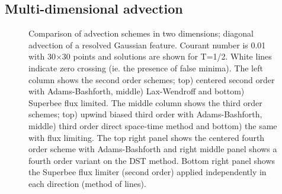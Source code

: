 

\subsection{Multi-dimensional advection}

\begin{figure}
\caption{
Comparison of advection schemes in two dimensions; diagonal advection
of a resolved Gaussian feature. Courant number is 0.01 with
30$\times$30 points and solutions are shown for T=1/2. White lines
indicate zero crossing (ie. the presence of false minima).  The left
column shows the second order schemes; top) centered second order with
Adams-Bashforth, middle) Lax-Wendroff and bottom) Superbee flux
limited. The middle column shows the third order schemes; top) upwind
biased third order with Adams-Bashforth, middle) third order direct
space-time method and bottom) the same with flux limiting. The top
right panel shows the centered fourth order scheme with
Adams-Bashforth and right middle panel shows a fourth order variant on
the DST method. Bottom right panel shows the Superbee flux limiter
(second order) applied independently in each direction (method of
lines).
\label{fig:advect-2d-lo-diag}
}
\end{figure}

